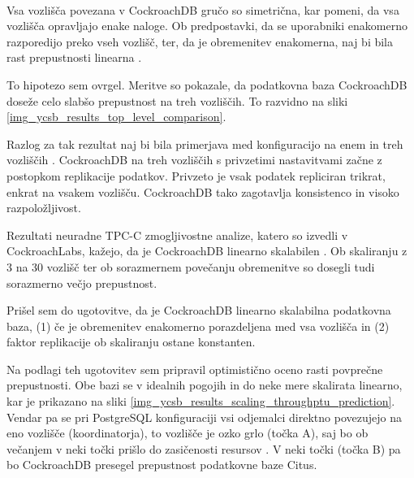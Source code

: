 \documentclass[a4paper, 12pt]{book}
\begin{document}
\ \\
Vsa vozlišča povezana v CockroachDB gručo so simetrična, kar pomeni, da vsa vozlišča opravljajo enake naloge. Ob predpostavki, da se uporabniki enakomerno razporedijo preko vseh vozlišč, ter, da je obremenitev enakomerna, naj bi bila rast prepustnosti linearna \cite{CRDB-design}.


To hipotezo sem ovrgel. Meritve so pokazale, da podatkovna baza CockroachDB doseže celo slabšo prepustnost na treh vozliščih. To razvidno na sliki \ref{img_ycsb_results_top_level_comparison}.

Razlog za tak rezultat naj bi bila primerjava med konfiguracijo na enem in treh vozliščih \cite{CRDB-YCSB-perf-analisis}. CockroachDB na treh vozliščih s privzetimi nastavitvami začne z postopkom replikacije podatkov. Privzeto je vsak podatek repliciran trikrat, enkrat na vsakem vozlišču. CockroachDB tako zagotavlja konsistenco in visoko razpoložljivost.

Rezultati neuradne TPC-C zmogljivostne analize, katero so izvedli v Co\-ckroachLabs, kažejo, da je CockroachDB linearno skalabilen \cite{CRDB-TPCC-perforamance-report}. Ob skali\-ranju z 3 na 30 vozlišč ter ob sorazmernem povečanju obremenitve so dosegli tudi sorazmerno večjo prepustnost.

Prišel sem do ugotovitve, da je CockroachDB linearno skalabilna podatkovna baza, (1) če je obremenitev enakomerno porazdeljena med vsa vozlišča in (2) faktor replikacije ob skaliranju ostane konstanten.

Na podlagi teh ugotovitev sem pripravil optimistično oceno rasti povprečne prepustnosti. Obe bazi se v idealnih pogojih in do neke mere skalirata linearno, kar je prikazano na sliki \ref{img_ycsb_results_scaling_throughptu_prediction}. Vendar pa se pri PostgreSQL konfiguraciji vsi odjemalci direktno povezujejo na eno vozlišče (koordinatorja), to vozlišče je ozko grlo (točka A), saj bo ob večanjem v neki točki prišlo do zasičenosti resursov \cite{Citus-add-coordinator}. V neki točki (točka B) pa bo CockroachDB presegel prepustnost podatkovne baze Citus.
\end{document}
